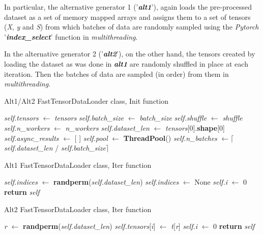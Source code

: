 \documentclass[pdfa%
,cucitura%
]{toptesi}
\begin{document}
In particular, the alternative generator 1 ('\textit{\textbf{alt1}}'), again loads the pre-processed dataset as a set of memory mapped arrays and assigns them to a set of tensors (\textit{X}, \textit{y} and \textit{S}) from which batches of data are randomly sampled using the \textit{Pytorch} '\textit{\textbf{index\_select}}' function in \textit{multithreading}.

In the alternative generator 2 ('\textit{\textbf{alt2}}'), on the other hand, the tensors created by loading the dataset as was done in \textit{\textbf{alt1}} are randomly shuffled in place at each iteration. Then the batches of data are sampled (in order) from them in \textit{multithreading}.

\begin{algorithm}[h!]
	\caption{Alt1/Alt2 FastTensorDataLoader class, Init function}\label{alg:Alt1_2FastDataLoaderInit}
	\begin{algorithmic}[1]
		\State \textit{self.tensors} $\gets$ \textit{tensors}
		\State \textit{self.batch\_size} $\gets$ \textit{batch\_size}
		\State \textit{self.shuffle} $\gets$ \textit{shuffle}
		\State \textit{self.n\_workers} $\gets$ \textit{n\_workers}
		\State \textit{self.dataset\_len} $\gets$ \textit{tensors}[0].\textbf{shape}[0]
		\State
		\State \textit{self.async\_results} $\gets$ [ ]
		\State \textit{self.pool} $\gets$ \textbf{ThreadPool}()
		\EndIf
		\State
		\State \textit{self.n\_batches} $\gets \lceil$\textit{self.dataset\_len} / \textit{self.batch\_size}$\rceil$
		\EndFunction
	\end{algorithmic}
\end{algorithm}

\begin{algorithm}[h!]
	\caption{Alt1 FastTensorDataLoader class, Iter function}\label{alg:Alt1FastDataLoaderIter}
	\begin{algorithmic}[1]
		\State \textit{self.indices} $\gets$ \textbf{randperm}(\textit{self.dataset\_len})
		\Else
		\State \textit{self.indices} $\gets$ None
		\EndIf
		\State
		\State \textit{self.i} $\gets$ 0
		\State \textbf{return} \textit{self}			
		\EndFunction
	\end{algorithmic}
\end{algorithm}

\begin{algorithm}[h!]
	\caption{Alt2 FastTensorDataLoader class, Iter function}\label{alg:Alt2FastDataLoaderIter}
	\begin{algorithmic}[1]
		\State \textit{r} $\gets$ \textbf{randperm}(\textit{self.dataset\_len})
		\State \textit{self.tensors}[\textit{i}] $\gets$ \textit{t}[\textit{r}]
		\EndFor
		\EndIf
		\State
		\State \textit{self.i} $\gets$ 0
		\State \textbf{return} \textit{self}			
		\EndFunction
	\end{algorithmic}
\end{algorithm}
\end{document}
